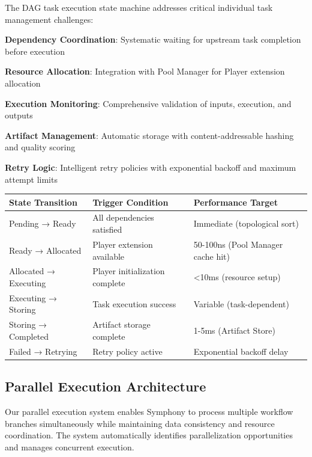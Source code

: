 The DAG task execution state machine addresses critical individual task management challenges:

\begin{expandedlist}
    \item \textbf{Dependency Coordination}: Systematic waiting for upstream task completion before execution
    \item \textbf{Resource Allocation}: Integration with Pool Manager for Player extension allocation
    \item \textbf{Execution Monitoring}: Comprehensive validation of inputs, execution, and outputs
    \item \textbf{Artifact Management}: Automatic storage with content-addressable hashing and quality scoring
    \item \textbf{Retry Logic}: Intelligent retry policies with exponential backoff and maximum attempt limits
\end{expandedlist}

\begin{center}
\begin{tabular}{@{}lll@{}}
\toprule
\textbf{State Transition} & \textbf{Trigger Condition} & \textbf{Performance Target} \\
\midrule
Pending → Ready & All dependencies satisfied & Immediate (topological sort) \\
Ready → Allocated & Player extension available & 50-100ns (Pool Manager cache hit) \\
Allocated → Executing & Player initialization complete & <10ms (resource setup) \\
Executing → Storing & Task execution success & Variable (task-dependent) \\
Storing → Completed & Artifact storage complete & 1-5ms (Artifact Store) \\
Failed → Retrying & Retry policy active & Exponential backoff delay \\
\bottomrule
\end{tabular}
\end{center}

\subsection*{Parallel Execution Architecture}

Our parallel execution system enables Symphony to process multiple workflow branches simultaneously while maintaining data consistency and resource coordination. The system automatically identifies parallelization opportunities and manages concurrent execution.

